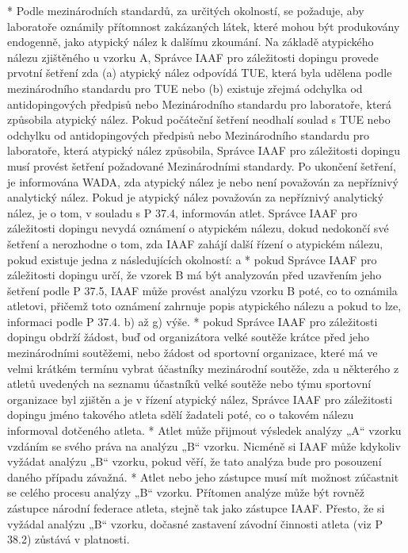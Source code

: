 * Podle mezinárodních standardů, za určitých okolností, se požaduje, aby laboratoře oznámily přítomnost zakázaných látek, které mohou být produkovány endogenně, jako atypický nález k dalšímu zkoumání. Na základě atypického nálezu zjištěného u vzorku A, Správce IAAF pro záležitosti dopingu provede prvotní šetření zda (a) atypický nález odpovídá TUE, která byla udělena podle mezinárodního standardu pro TUE nebo (b) existuje zřejmá odchylka od antidopingových předpisů nebo Mezinárodního standardu pro laboratoře, která způsobila atypický nález. Pokud počáteční šetření neodhalí soulad s TUE nebo odchylku od antidopingových předpisů nebo Mezinárodního standardu pro laboratoře, která atypický nález způsobila, Správce IAAF pro záležitosti dopingu musí provést šetření požadované Mezinárodními standardy. Po ukončení šetření, je informována WADA, zda atypický nález je nebo není považován za nepříznivý analytický nález. Pokud je atypický nález považován za nepříznivý analytický nález, je o tom, v souladu s P 37.4, informován atlet. Správce IAAF pro záležitosti dopingu nevydá oznámení o atypickém nálezu, dokud nedokončí své šetření a nerozhodne o tom, zda IAAF zahájí další řízení o atypickém nálezu, pokud existuje jedna z následujících okolností:
  \begitems \style a
  * pokud Správce IAAF pro záležitosti dopingu určí, že vzorek B má být analyzován před uzavřením jeho šetření podle P 37.5, IAAF může provést analýzu vzorku B poté, co to oznámila atletovi, přičemž toto oznámení zahrnuje popis atypického nálezu a pokud to lze, informaci podle P 37.4. b) až g) výše.
  * pokud Správce IAAF pro záležitosti dopingu obdrží žádost, buď od organizátora velké soutěže krátce před jeho mezinárodními soutěžemi, nebo žádost od sportovní organizace, které má ve velmi krátkém termínu vybrat účastníky mezinárodní soutěže, zda u některého z atletů uvedených na seznamu účastníků velké soutěže nebo týmu sportovní organizace byl zjištěn a je v řízení atypický nález, Správce IAAF pro záležitosti dopingu jméno takového atleta sdělí žadateli poté, co o takovém nálezu informoval dotčeného atleta.
  \enditems
* Atlet může přijmout výsledek analýzy „A“ vzorku vzdáním se svého práva na analýzu „B“ vzorku. Nicméně si IAAF může kdykoliv vyžádat analýzu „B“ vzorku, pokud věří, že tato analýza bude pro posouzení daného případu závažná.
* Atlet nebo jeho zástupce musí mít možnost zúčastnit se celého procesu analýzy „B“ vzorku. Přítomen analýze může být rovněž zástupce národní federace atleta, stejně tak jako zástupce IAAF. Přesto, že si vyžádal analýzu „B“ vzorku, dočasné zastavení závodní činnosti atleta (viz P 38.2) zůstává v platnosti.
